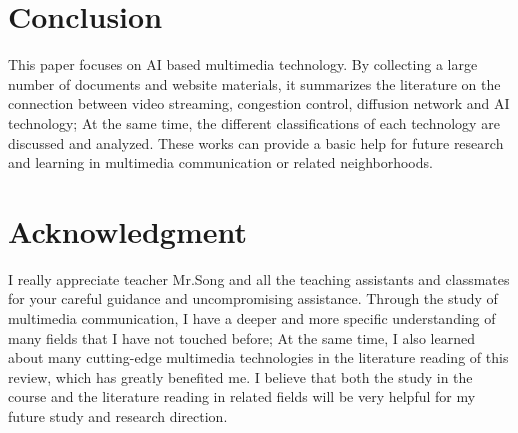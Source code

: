 \documentclass[conference]{IEEEtran}
\begin{document}
\section{Conclusion}\label{sec6}
This paper focuses on AI based multimedia technology. By collecting a large number of documents and website materials, it summarizes the literature on the connection between video streaming, congestion control, diffusion network and AI technology; At the same time, the different classifications of each technology are discussed and analyzed. These works can provide a basic help for future research and learning in multimedia communication or related neighborhoods.

\section*{Acknowledgment}
I really appreciate teacher Mr.Song and all the teaching assistants and classmates for your careful guidance and uncompromising assistance. Through the study of multimedia communication, I have a deeper and more specific understanding of many fields that I have not touched before; At the same time, I also learned about many cutting-edge multimedia technologies in the literature reading of this review, which has greatly benefited me. I believe that both the study in the course and the literature reading in related fields will be very helpful for my future study and research direction.
\end{document}
